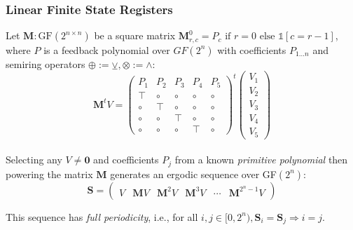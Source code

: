 \documentclass{beamer}
\begin{document}
    \begin{frame}
        \frametitle{Linear Finite State Registers}
        Let $\textbf{M}: \text{GF}(2^{n\times n})$ be a square matrix $\mathbf{M}^0_{r, c} = P_c \text{ if } r=0 \text{ else } \mathds{1}[c = r - 1]$, where $P$ is a feedback polynomial over $GF(2^n)$ with coefficients $P_{1\ldots n}$ and semiring operators $\oplus := \veebar, \otimes := \land$:\\

        \[
            \mathbf{M}^tV = \begin{pmatrix}
                                P_1 & P_2 & P_3 & P_4 & P_5 \\
                                \top & \circ & \circ & \circ & \circ \\
                                \circ & \top & \circ & \circ & \circ \\
                                \circ & \circ & \top & \circ & \circ \\
                                \circ & \circ & \circ & \top & \circ
            \end{pmatrix}^t
            \begin{pmatrix}
                V_1 \\
                V_2 \\
                V_3 \\
                V_4 \\
                V_5
            \end{pmatrix}
        \]\\

        Selecting any $V \neq \mathbf{0}$ and coefficients $P_j$ from a known \textit{primitive polynomial} then powering the matrix $\mathbf{M}$ generates an ergodic sequence over GF$(2^n)$:\\

        \[
        \mathbf{S} = \begin{pmatrix}V & \mathbf{M}V & \mathbf{M}^{2}V & \mathbf{M}^{3}V & \cdots & \mathbf{M}^{2^n-1}V \end{pmatrix}
        \]

        This sequence has \textit{full periodicity}, i.e., for all $i, j \in [0, 2^n), \mathbf{S}_i = \mathbf{S}_j \Rightarrow i = j$.
    \end{frame}
\end{document}
